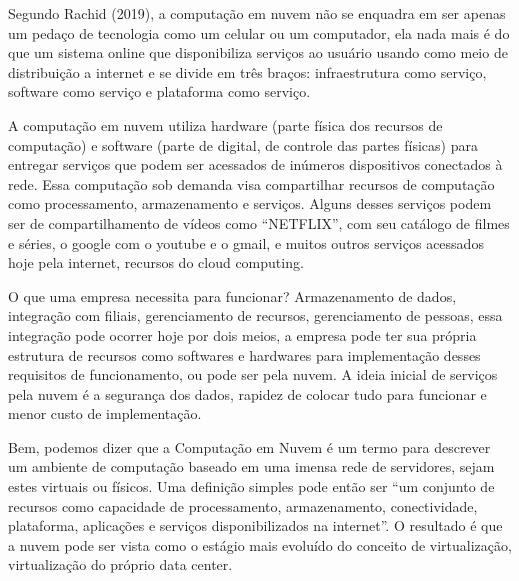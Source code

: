 \begin{justify}
    Segundo Rachid (2019), a computação em nuvem não se enquadra em ser apenas um
    pedaço de tecnologia como um celular ou um computador, ela nada mais é do que um
    sistema online que disponibiliza serviços ao usuário usando como meio de distribuição a
    internet e se divide em três braços: infraestrutura como serviço, software como serviço e
    plataforma como serviço.

    A computação em nuvem utiliza hardware (parte física dos recursos de computação) e
    software (parte de digital, de controle das partes físicas) para entregar serviços que podem
    ser acessados de inúmeros dispositivos conectados à rede. Essa computação sob demanda
    visa compartilhar recursos de computação como processamento, 
    armazenamento e
    serviços. Alguns desses serviços podem ser de compartilhamento de vídeos como
    “NETFLIX”, com seu catálogo de filmes e séries, o google com o youtube e o gmail, e
    muitos outros serviços acessados hoje pela internet, recursos do cloud computing.

    O que uma empresa necessita para funcionar? Armazenamento de dados, integração com
    filiais, gerenciamento de recursos, gerenciamento de pessoas, essa integração pode ocorrer
    hoje por dois meios, a empresa pode ter sua própria estrutura de recursos como softwares e
    hardwares para implementação desses requisitos de funcionamento, ou pode ser pela
    nuvem. A ideia inicial de serviços pela nuvem é a segurança dos dados, rapidez de colocar
    tudo para funcionar e menor custo de implementação.

    \vspace{0.2cm}
    \begin{flushright}
        \begin{minipage}{.7\textwidth}
            \noindent
            \footnotesize
            
            \begin{justify}
            Bem, podemos dizer que a Computação em Nuvem é um termo para descrever um
            ambiente de computação baseado em uma imensa rede de servidores, sejam estes
            virtuais ou físicos. Uma definição simples pode então ser “um conjunto de recursos
            como capacidade de processamento, armazenamento, conectividade, plataforma,
            aplicações e serviços disponibilizados na internet”. O resultado é que a nuvem pode
            ser vista como o estágio mais evoluído do conceito de virtualização, virtualização do
            próprio data center. \cite{taurion2009cloud}
            \end{justify}
        \end{minipage}
    \end{flushright}
    \vspace{0.2cm}

\end{justify}


